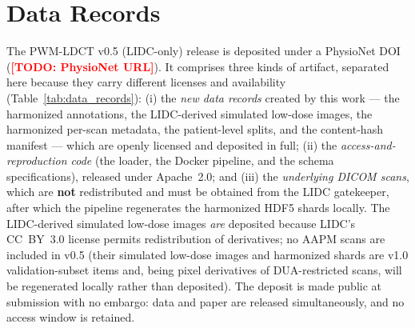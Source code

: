 \documentclass[twoside,11pt]{article}
\newcommand{\todo}[1]{\textcolor{red}{\textbf{[TODO: #1]}}}
\begin{document}
\section*{Data Records}

The PWM-LDCT v0.5 (LIDC-only) release is deposited under a PhysioNet DOI (\todo{PhysioNet URL}). It comprises three kinds of artifact, separated here because they carry different licenses and availability (Table~\ref{tab:data_records}): (i) the \emph{new data records} created by this work --- the harmonized annotations, the LIDC-derived simulated low-dose images, the harmonized per-scan metadata, the patient-level splits, and the content-hash manifest --- which are openly licensed and deposited in full; (ii) the \emph{access-and-reproduction code} (the loader, the Docker pipeline, and the schema specifications), released under Apache~2.0; and (iii) the \emph{underlying DICOM scans}, which are \textbf{not} redistributed and must be obtained from the LIDC gatekeeper, after which the pipeline regenerates the harmonized HDF5 shards locally. The LIDC-derived simulated low-dose images \emph{are} deposited because LIDC's CC~BY~3.0 license permits redistribution of derivatives; no AAPM scans are included in v0.5 (their simulated low-dose images and harmonized shards are v1.0 validation-subset items and, being pixel derivatives of DUA-restricted scans, will be regenerated locally rather than deposited). The deposit is made public at submission with no embargo: data and paper are released simultaneously, and no access window is retained.
\end{document}
